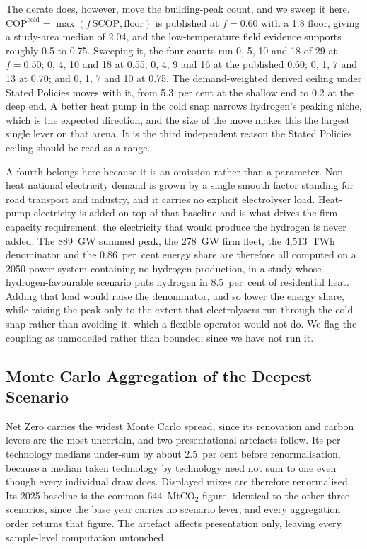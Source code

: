The derate does, however, move the building-peak count, and we sweep it here. $\mathrm{COP}^{\mathrm{cold}}=\max(f\,\mathrm{SCOP},\text{floor})$ is published at
$f=0.60$ with a 1.8 floor, giving a study-area median of 2.04, and the low-temperature
field evidence supports roughly 0.5 to 0.75. Sweeping it, the four counts run 0, 5, 10
and 18 of 29 at $f=0.50$; 0, 4, 10 and 18 at 0.55; 0, 4, 9 and 16 at the published 0.60;
0, 1, 7 and 13 at 0.70; and 0, 1, 7 and 10 at 0.75. The demand-weighted derived ceiling
under Stated Policies moves with it, from 5.3~per cent at the shallow end to 0.2 at the
deep end. A better heat pump in the cold snap narrows hydrogen's peaking niche, which is
the expected direction, and the size of the move makes this the largest single lever on
that arena. It is the third independent reason the Stated Policies ceiling should be read
as a range.

A fourth belongs here because it is an omission rather than a parameter. Non-heat national
electricity demand is grown by a single smooth factor standing for road transport and
industry, and it carries no explicit electrolyser load. Heat-pump electricity is added on
top of that baseline and is what drives the firm-capacity requirement; the electricity
that would produce the hydrogen is never added. The 889~GW summed peak, the 278~GW firm
fleet, the 4{,}513~TWh denominator and the 0.86~per~cent energy share are therefore all
computed on a 2050 power system containing no hydrogen production, in a study whose
hydrogen-favourable scenario puts hydrogen in 8.5~per~cent of residential heat. Adding
that load would raise the denominator, and so lower the energy share, while raising the
peak only to the extent that electrolysers run through the cold snap rather than avoiding
it, which a flexible operator would not do. We flag the coupling as unmodelled rather than
bounded, since we have not run it.

\subsection{Monte Carlo Aggregation of the Deepest Scenario}
Net Zero carries the widest Monte Carlo spread, since its renovation and carbon
levers are the most uncertain, and two presentational artefacts follow. Its
per-technology medians under-sum by about 2.5~per cent before renormalisation, because
a median taken technology by technology need not sum to one even though every
individual draw does. Displayed mixes are therefore renormalised. Its 2025 baseline is the common 644~MtCO$_2$ figure, identical to the other three scenarios, since the base year carries no scenario lever, and every aggregation order returns that figure. The artefact affects presentation only, leaving every sample-level computation untouched.

